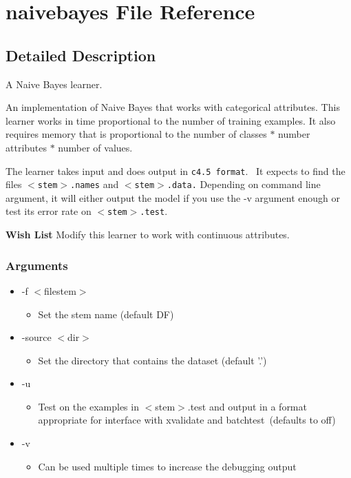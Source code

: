 \section{naivebayes File Reference}
\label{naivebayes}


\subsection{Detailed Description}
A Naive Bayes learner. 

An implementation of Naive Bayes that works with categorical attributes. This learner works in time proportional to the number of training examples. It also requires memory that is proportional to the number of classes $\ast$ number attributes $\ast$ number of values.

The learner takes input and does output in {\tt c4.5 format}. \  It expects to find the files {\tt $<$stem$>$.names} and {\tt $<$stem$>$.data.} Depending on command line argument, it will either output the model if you use the -v argument enough or test its error rate on {\tt $<$stem$>$.test}.

\begin{Desc}
\item[{\bf Wish List}]Modify this learner to work with continuous attributes. \end{Desc}
\subsubsection*{Arguments}

\begin{itemize}
\item -f $<$filestem$>$\begin{itemize}
\item Set the stem name (default DF)\end{itemize}
\item -source $<$dir$>$\begin{itemize}
\item Set the directory that contains the dataset (default '.')\end{itemize}
\item -u\begin{itemize}
\item Test on the examples in $<$stem$>$.test and output in a format appropriate for interface with xvalidate and batchtest\  (defaults to off)\end{itemize}
\item -v\begin{itemize}
\item Can be used multiple times to increase the debugging output\end{itemize}
\end{itemize}


